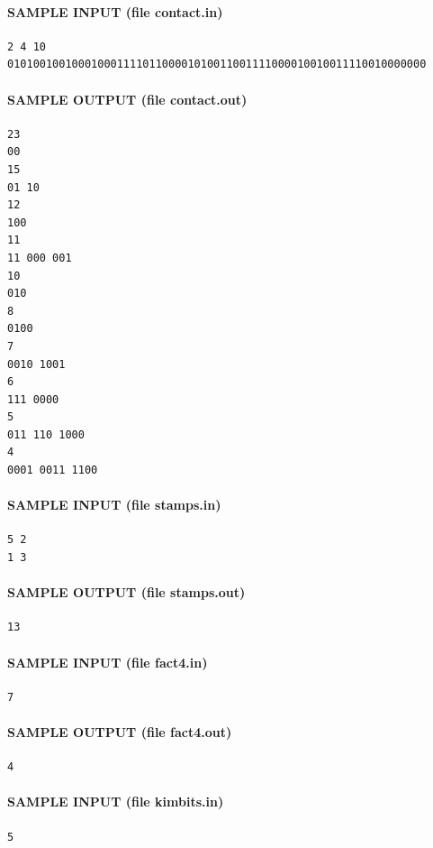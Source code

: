 \documentclass[11pt]{article}
\begin{document}
\paragraph{SAMPLE INPUT (file contact.in)}
\begin{verbatim}
2 4 10
01010010010001000111101100001010011001111000010010011110010000000
\end{verbatim}

\paragraph{SAMPLE OUTPUT (file contact.out)}
\begin{verbatim}
23
00
15
01 10
12
100
11
11 000 001
10
010
8
0100
7
0010 1001
6
111 0000
5
011 110 1000
4
0001 0011 1100
\end{verbatim}

\paragraph{SAMPLE INPUT (file stamps.in)}
\begin{verbatim}
5 2
1 3
\end{verbatim}

\paragraph{SAMPLE OUTPUT (file stamps.out)}
\begin{verbatim}
13
\end{verbatim}

\paragraph{SAMPLE INPUT (file fact4.in)}
\begin{verbatim}
7
\end{verbatim}

\paragraph{SAMPLE OUTPUT (file fact4.out)}
\begin{verbatim}
4
\end{verbatim}

\paragraph{SAMPLE INPUT (file kimbits.in)}
\begin{verbatim}
5
\end{verbatim}
\end{document}

